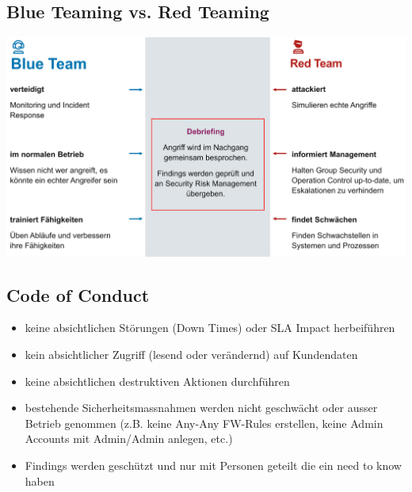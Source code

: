 \subsection{Blue Teaming vs. Red Teaming}
\begin{center}
    \includegraphics[width=1.0\linewidth]{./img/14-red_teaming/blue_red}
    \vspace{-8pt}
\end{center}

\subsection{Code of Conduct}
\begin{itemize}
    \item keine absichtlichen Störungen (Down Times) oder SLA Impact herbeiführen
    \item kein absichtlicher Zugriff (lesend oder verändernd) auf Kundendaten
    \item keine absichtlichen destruktiven Aktionen durchführen
    \item bestehende Sicherheitsmassnahmen werden nicht geschwächt oder ausser Betrieb genommen (z.B. keine Any-Any FW-Rules erstellen, keine Admin Accounts mit Admin/Admin anlegen, etc.)
    \item Findings werden geschützt und nur mit Personen geteilt die ein need to know haben
\end{itemize}

\columnbreak

